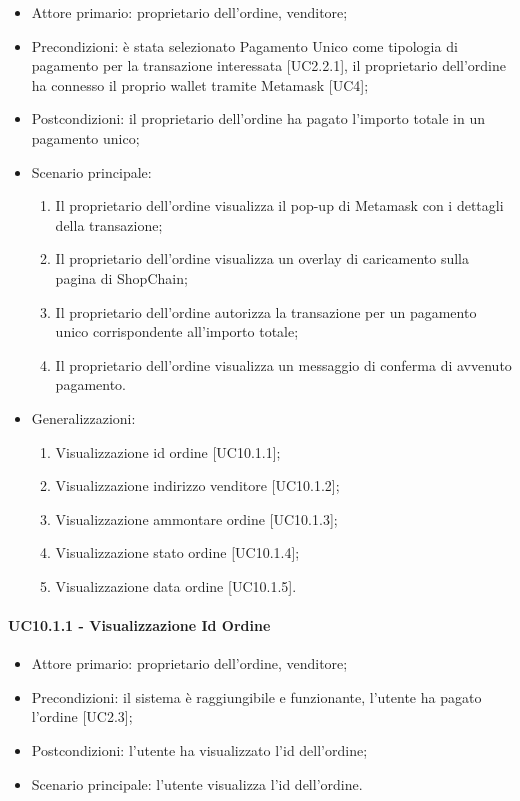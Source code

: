 \begin{itemize}
    \item Attore primario: proprietario dell'ordine, venditore;
    \item Precondizioni: è stata selezionato Pagamento Unico come tipologia di pagamento per la transazione interessata [UC2.2.1], 
            il proprietario dell'ordine ha connesso il proprio wallet\glo{} tramite Metamask\glo{} [UC4];
    \item Postcondizioni: il proprietario dell'ordine ha pagato l'importo totale in un pagamento unico;
    \item Scenario principale:
    \begin{enumerate}
        \item Il proprietario dell'ordine visualizza il pop-up di Metamask\glo{} con i dettagli della transazione;
        \item Il proprietario dell'ordine visualizza un overlay di caricamento sulla pagina di ShopChain;
        \item Il proprietario dell'ordine autorizza la transazione per un pagamento unico corrispondente all'importo totale;
        \item Il proprietario dell'ordine visualizza un messaggio di conferma di avvenuto pagamento.
    \end{enumerate}
    \item Generalizzazioni:
        \begin{enumerate}
            \item Visualizzazione id ordine [UC10.1.1];
            \item Visualizzazione indirizzo venditore [UC10.1.2];
            \item Visualizzazione ammontare ordine [UC10.1.3];
            \item Visualizzazione stato ordine [UC10.1.4];
            \item Visualizzazione data ordine [UC10.1.5].
        \end{enumerate}
\end{itemize}

\paragraph{UC10.1.1 - Visualizzazione Id Ordine}

\begin{itemize}
    \item Attore primario: proprietario dell'ordine, venditore;
    \item Precondizioni: il sistema è raggiungibile e funzionante, l'utente ha pagato l'ordine [UC2.3];
    \item Postcondizioni: l'utente ha visualizzato l'id dell'ordine;
    \item Scenario principale: l'utente visualizza l'id dell'ordine.
\end{itemize}

